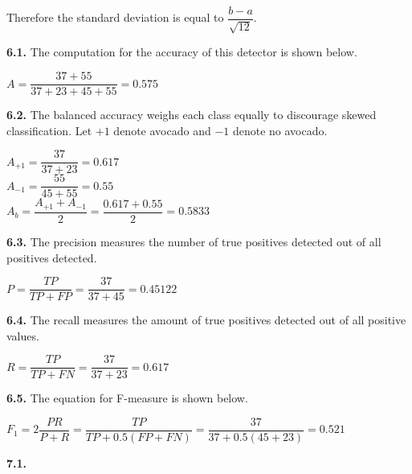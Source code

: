 \documentclass[12pt]{article}
\begin{document}
Therefore the standard deviation is equal to $\dfrac{b-a}{\sqrt{12}}$. 

{\bf 6.1.} The computation for the accuracy of this detector is shown below.

\begin{center}

$A=\dfrac{37+55}{37+23+45+55}=0.575$\\

\end{center}

{\bf 6.2.} The balanced accuracy weighs each class equally to discourage skewed classification. Let $+1$ denote avocado and $-1$ denote no avocado.

\begin{center}

$A_{+1}=\dfrac{37}{37+23}=0.617$\\
\bigskip
$A_{-1}=\dfrac{55}{45+55}=0.55$\\
\bigskip
$A_{b}=\dfrac{A_{+1}+A_{-1}}{2}=\dfrac{0.617+0.55}{2}=0.5833$\\

\end{center}

{\bf 6.3.} The precision measures the number of true positives detected out of all positives detected.

\begin{center}

$P=\dfrac{TP}{TP+FP}=\dfrac{37}{37+45}=0.45122$\\

\end{center}

{\bf 6.4.} The recall measures the amount of true positives detected out of all positive values.

\begin{center}

$R=\dfrac{TP}{TP+FN}=\dfrac{37}{37+23}=0.617$\\

\end{center}

{\bf 6.5.} The equation for F-measure is shown below.

\begin{center}

$F_{1}=2\dfrac{PR}{P+R}=\dfrac{TP}{TP+0.5(FP+FN)}=\dfrac{37}{37+0.5(45+23)}=0.521$\\

\end{center}

{\bf 7.1.} 
\end{document}
